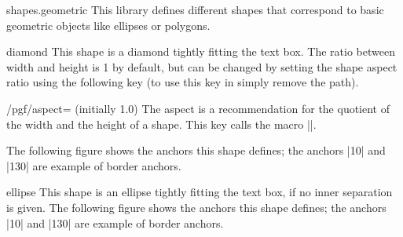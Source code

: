 \begin{pgflibrary}{shapes.geometric}
    This library defines different shapes that correspond to basic geometric
    objects like ellipses or polygons.
\end{pgflibrary}

\begin{shape}{diamond}
    This shape is a diamond tightly fitting the text box. The ratio between
    width and height is 1 by default, but can be changed by setting the shape
    aspect ratio using the following \pgfname{} key (to use this key in
    \tikzname{} simply remove the  path).

    \begin{key}{/pgf/aspect= (initially 1.0)}
        The aspect is a recommendation for the quotient of the width and the
        height of a shape. This key calls the macro |\pgfsetshapeaspect|.
    \end{key}

    The following figure shows the anchors this shape defines; the anchors |10|
    and |130| are example of border anchors.
\begin{codeexample}[preamble={\usetikzlibrary{shapes.geometric}}]
\Huge
{}
\end{codeexample}
\end{shape}

\begin{shape}{ellipse}
    This shape is an ellipse tightly fitting the text box, if no inner
    separation is given. The following figure shows the anchors this shape
    defines; the anchors |10| and |130| are example of border anchors.
\begin{codeexample}[preamble={\usetikzlibrary{shapes.geometric}}]
\Huge
{}
\end{codeexample}
\end{shape}

